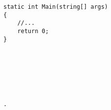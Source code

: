 
\begin{lstlisting}
static int Main(string[] args)
{
    //...
    return 0;
}







.
\end{lstlisting}
